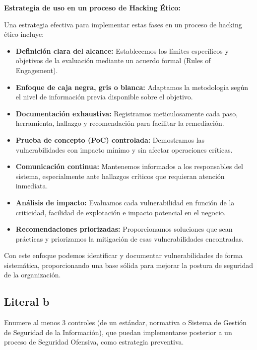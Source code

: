 {\textbf{Estrategia de uso en un proceso de Hacking Ético:}

Una estrategia efectiva para implementar estas fases en un proceso de hacking ético incluye:

\begin{itemize}
    \item \textbf{Definición clara del alcance:} Establecemos los límites específicos y objetivos de la evaluación mediante un acuerdo formal (Rules of Engagement).
    
    \item \textbf{Enfoque de caja negra, gris o blanca:} Adaptamos la metodología según el nivel de información previa disponible sobre el objetivo.
    
    \item \textbf{Documentación exhaustiva:} Registramos meticulosamente cada paso, herramienta, hallazgo y recomendación para facilitar la remediación.
    
    \item \textbf{Prueba de concepto (PoC) controlada:} Demostramos las vulnerabilidades con impacto mínimo y sin afectar operaciones críticas.
    
    \item \textbf{Comunicación continua:} Mantenemos informados a los responsables del sistema, especialmente ante hallazgos críticos que requieran atención inmediata.
    
    \item \textbf{Análisis de impacto:} Evaluamos cada vulnerabilidad en función de la criticidad, facilidad de explotación e impacto potencial en el negocio.
    
    \item \textbf{Recomendaciones priorizadas:} Proporcionamos soluciones que sean prácticas y priorizamos la mitigación de esas vulnerabilidades encontradas.
\end{itemize}

Con este enfoque podemos identificar y documentar vulnerabilidades de forma sistemática, proporcionando una base sólida para mejorar la postura de seguridad de la organización.





\subsection{Literal b}
Enumere al menos 3 controles (de un estándar, normativa o Sistema de Gestión de Seguridad de la Información), que puedan implementarse posterior a un proceso de Seguridad Ofensiva, como estrategia preventiva.

}
